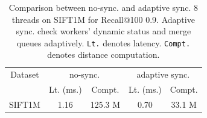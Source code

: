 \begin{table}[]
    \caption{Comparison between no-sync. and adaptive sync.
        \textmd{8 threads on SIFT1M for Recall@100 0.9. 
            Adaptive sync. check workers' dynamic status and merge queues adaptively.
            \texttt{Lt.} denotes latency. \texttt{Compt.} denotes distance computation.}}
    
    \label{minjia_tab:comp_no_sync_bulk_step}
    \begin{tabular}{|c|c|c|c|c|}
        \hline
        Dataset &               \multicolumn{2}{c|}{no-sync.}               &          \multicolumn{2}{c|}{adaptive sync.}           \\ \cline{2-5}
        &         Lt. (ms.)         &            Compt.            &         Lt. (ms.)         &           Compt.            \\ \hline\hline
        SIFT1M  & \multicolumn{1}{c|}{1.16} & \multicolumn{1}{c|}{125.3 M} & \multicolumn{1}{c|}{0.70} & \multicolumn{1}{c|}{33.1 M} \\ \hline
    \end{tabular}
\end{table}


